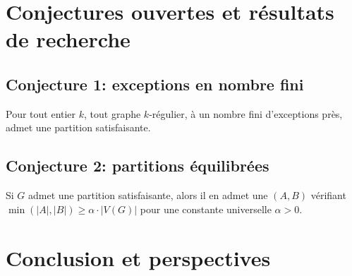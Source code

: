 

\section{Conjectures ouvertes et résultats de recherche}\label{sec:conjectures}

\subsection{Conjecture 1: exceptions en nombre fini}\label{subsec:conj1}

\begin{conjecture}
    Pour tout entier \(k\), tout graphe \(k\)-régulier, à un nombre fini d'exceptions
    près, admet une partition satisfaisante.
\end{conjecture}

%
%



\subsection{Conjecture 2: partitions équilibrées}\label{subsec:conj2}

\begin{conjecture}
    Si \(G\) admet une partition satisfaisante, alors il en admet une \((A, B)\)
    vérifiant \(\min(|A|, |B|) \geq \alpha \cdot |V(G)|\) pour une constante
    universelle \(\alpha > 0\).
\end{conjecture}

%
%



\section{Conclusion et perspectives}\label{sec:conclusion}






